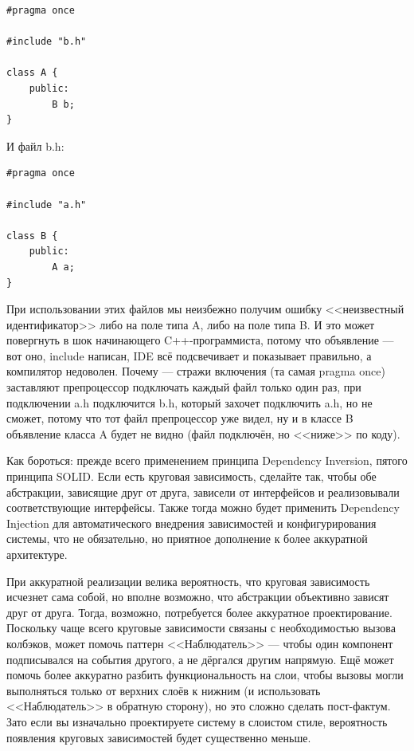 \documentclass[a5paper]{article}
\begin{document}
\begin{verbatim}
#pragma once

#include "b.h"

class A {
    public:
        B b;
}
\end{verbatim}

И файл b.h:

\begin{verbatim}
#pragma once

#include "a.h"

class B {
    public:
        A a;
}
\end{verbatim}

При использовании этих файлов мы неизбежно получим ошибку <<неизвестный идентификатор>> либо на поле типа A, либо на поле типа B. И это может повергнуть в шок начинающего C++-программиста, потому что объявление --- вот оно, include написан, IDE всё подсвечивает и показывает правильно, а компилятор недоволен. Почему --- стражи включения (та самая pragma once) заставляют препроцессор подключать каждый файл только один раз, при подключении a.h подключится b.h, который захочет подключить a.h, но не сможет, потому что тот файл препроцессор уже видел, ну и в классе B объявление класса A будет не видно (файл подключён, но <<ниже>> по коду).

Как бороться: прежде всего применением принципа Dependency Inversion, пятого принципа SOLID. Если есть круговая зависимость, сделайте так, чтобы обе абстракции, зависящие друг от друга, зависели от интерфейсов и реализовывали соответствующие интерфейсы. Также тогда можно будет применить Dependency Injection для автоматического внедрения зависимостей и конфигурирования системы, что не обязательно, но приятное дополнение к более аккуратной архитектуре.

При аккуратной реализации велика вероятность, что круговая зависимость исчезнет сама собой, но вполне возможно, что абстракции объективно зависят друг от друга. Тогда, возможно, потребуется более аккуратное проектирование. Поскольку чаще всего круговые зависимости связаны с необходимостью вызова колбэков, может помочь паттерн <<Наблюдатель>> --- чтобы один компонент подписывался на события другого, а не дёргался другим напрямую. Ещё может помочь более аккуратно разбить функциональность на слои, чтобы вызовы могли выполняться только от верхних слоёв к нижним (и использовать <<Наблюдатель>> в обратную сторону), но это сложно сделать пост-фактум. Зато если вы изначально проектируете систему в слоистом стиле, вероятность появления круговых зависимостей будет существенно меньше.
\end{document}

